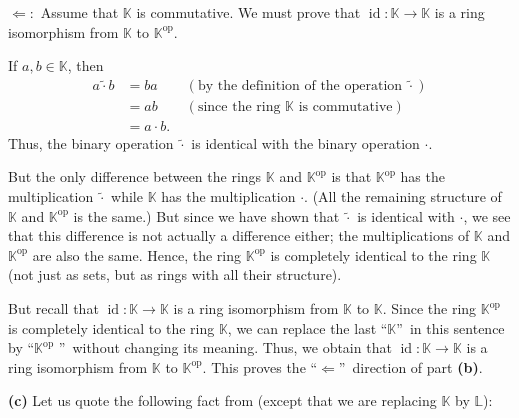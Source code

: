 \documentclass[paper=a4, fontsize=12pt]{scrartcl}%
\theoremstyle{plainsl}
\theoremstyle{definition}
\theoremstyle{remark}
\begin{document}
$\Longleftarrow:$ Assume that $\mathbb{K}$ is commutative. We must prove that
$\operatorname{id}:\mathbb{K}\rightarrow\mathbb{K}$ is a ring isomorphism from
$\mathbb{K}$ to $\mathbb{K}^{\operatorname{op}}$.

If $a,b\in\mathbb{K}$, then%
\begin{align*}
a\left.  \widetilde{\cdot}\right.  b  &  =ba\qquad\left(  \text{by the
definition of the operation }\left.  \widetilde{\cdot}\right.  \right) \\
&  =ab\qquad\left(  \text{since the ring }\mathbb{K}\text{ is commutative}%
\right) \\
&  =a\cdot b.
\end{align*}
Thus, the binary operation $\left.  \widetilde{\cdot}\right.  $ is identical
with the binary operation $\cdot$.

But the only difference between the rings $\mathbb{K}$ and $\mathbb{K}%
^{\operatorname*{op}}$ is that $\mathbb{K}^{\operatorname*{op}}$ has the
multiplication $\left.  \widetilde{\cdot}\right.  $ while $\mathbb{K}$ has the
multiplication $\cdot$. (All the remaining structure of $\mathbb{K}$ and
$\mathbb{K}^{\operatorname*{op}}$ is the same.) But since we have shown that
$\left.  \widetilde{\cdot}\right.  $ is identical with $\cdot$, we see that
this difference is not actually a difference either; the multiplications of
$\mathbb{K}$ and $\mathbb{K}^{\operatorname*{op}}$ are also the same. Hence,
the ring $\mathbb{K}^{\operatorname*{op}}$ is completely identical to the ring
$\mathbb{K}$ (not just as sets, but as rings with all their structure).

But recall that $\operatorname*{id}:\mathbb{K}\rightarrow\mathbb{K}$ is a ring
isomorphism from $\mathbb{K}$ to $\mathbb{K}$. Since the ring $\mathbb{K}%
^{\operatorname*{op}}$ is completely identical to the ring $\mathbb{K}$, we
can replace the last \textquotedblleft$\mathbb{K}$\textquotedblright\ in this
sentence by \textquotedblleft$\mathbb{K}^{\operatorname*{op}}$%
\textquotedblright\ without changing its meaning. Thus, we obtain that
$\operatorname*{id}:\mathbb{K}\rightarrow\mathbb{K}$ is a ring isomorphism
from $\mathbb{K}$ to $\mathbb{K}^{\operatorname*{op}}$. This proves the
\textquotedblleft$\Longleftarrow$\textquotedblright\ direction of part
\textbf{(b)}.

\bigskip

\textbf{(c)} Let us quote the following fact from \cite[Exercise
6.5]{detnotes} (except that we are replacing $\mathbb{K}$ by $\mathbb{L}$):
\end{document}
